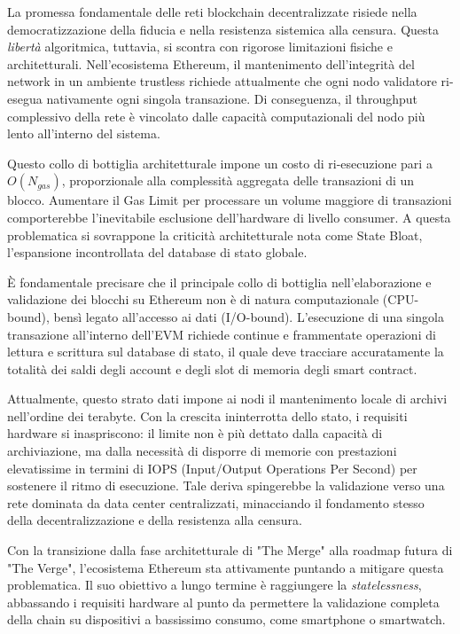 \documentclass[12pt,a4paper,openright,twoside]{report}
\begin{document}
La promessa fondamentale delle reti blockchain decentralizzate risiede nella democratizzazione della fiducia e nella resistenza sistemica alla censura. Questa \textit{libertà} algoritmica, tuttavia, si scontra con rigorose limitazioni fisiche e architetturali. Nell'ecosistema Ethereum, il mantenimento dell'integrità del network in un ambiente trustless richiede attualmente che ogni nodo validatore ri-esegua nativamente ogni singola transazione. Di conseguenza, il throughput complessivo della rete è vincolato dalle capacità computazionali del nodo più lento all'interno del sistema.

Questo collo di bottiglia architetturale impone un costo di ri-esecuzione pari a $O(N_{gas})$, proporzionale alla complessità aggregata delle transazioni di un blocco. Aumentare il Gas Limit per processare un volume maggiore di transazioni comporterebbe l'inevitabile esclusione dell'hardware di livello consumer. A questa problematica si sovrappone la criticità architetturale nota come State Bloat, l'espansione incontrollata del database di stato globale.

È fondamentale precisare che il principale collo di bottiglia nell'elaborazione e validazione dei blocchi su Ethereum non è di natura computazionale (CPU-bound), bensì legato all'accesso ai dati (I/O-bound). L'esecuzione di una singola transazione all'interno dell'EVM richiede continue e frammentate operazioni di lettura e scrittura sul database di stato, il quale deve tracciare accuratamente la totalità dei saldi degli account e degli slot di memoria degli smart contract.

Attualmente, questo strato dati impone ai nodi il mantenimento locale di archivi nell'ordine dei terabyte. Con la crescita ininterrotta dello stato, i requisiti hardware si inaspriscono: il limite non è più dettato dalla capacità di archiviazione, ma dalla necessità di disporre di memorie con prestazioni elevatissime in termini di IOPS (Input/Output Operations Per Second) per sostenere il ritmo di esecuzione. Tale deriva spingerebbe la validazione verso una rete dominata da data center centralizzati, minacciando il fondamento stesso della decentralizzazione e della resistenza alla censura.

Con la transizione dalla fase architetturale di "The Merge" alla roadmap futura di "The Verge"\cite{verge_2024}, l'ecosistema Ethereum sta attivamente puntando a mitigare questa problematica. Il suo obiettivo a lungo termine è raggiungere la \textit{statelessness}, abbassando i requisiti hardware al punto da permettere la validazione completa della chain su dispositivi a bassissimo consumo, come smartphone o smartwatch.
\end{document}
